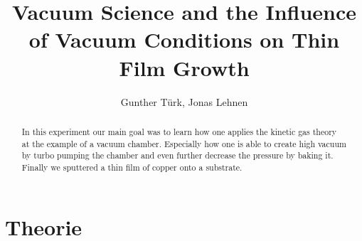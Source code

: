 \documentclass[]{article}
\title{Vacuum Science and the Inﬂuence of Vacuum Conditions on Thin Film Growth}
\author{Gunther T\"urk, Jonas Lehnen}
\begin{document}
\maketitle
\tableofcontents
\begin{abstract}
In this experiment our main goal was to learn how one applies the kinetic gas theory at the example of a vacuum chamber. Especially how one is able to create high vacuum by turbo pumping the chamber and even further decrease the pressure by baking it. Finally we sputtered a thin film of copper onto a substrate.

\end{abstract}

\section{Theorie}
\end{document}
